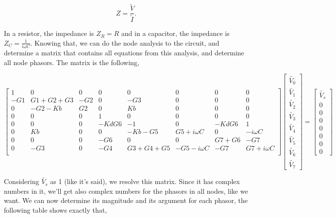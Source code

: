 \begin{equation}
  Z = \frac{\widetilde{V}}{\widetilde{I}}.
  \label{eq:impedance}
\end{equation}

\par In a resistor, the impedance is $Z_R=R$ and in a capacitor, the impedance is $Z_C=\frac{1}{i\omega C}$. Knowing that, we can do the node analysis to the circuit, and determine a matrix that contains all equations from this analysis, and determine all node phasors. The matrix is the following,

$$
\begin{bmatrix}
1 & 0 & 0 & 0 & 0 & 0 & 0 & 0 \\
-G1 & G1+G2+G3 & -G2 & 0 & -G3 & 0 & 0 & 0 \\
0 & -G2-Kb & G2 & 0 & Kb & 0 & 0 & 0 \\
0 & 0 & 0 & 1 & 0 & 0 & 0 & 0 \\
0 & 0 & 0 & -KdG6 & -1 & 0 & -KdG6 & 1 \\
0 & Kb & 0 & 0 & -Kb-G5 & G5+i\omega C & 0 & -i\omega C \\
0 & 0 & 0 & -G6 & 0 & 0 & G7+G6 & -G7 \\
0 & -G3 & 0 & -G4 & G3+G4+G5 & -G5-i\omega C & -G7 & G7+i\omega C \\
\end{bmatrix}
\begin{bmatrix}
\widetilde{V_0} \\
\widetilde{V_1} \\
\widetilde{V_2} \\
\widetilde{V_3} \\
\widetilde{V_4} \\
\widetilde{V_5} \\
\widetilde{V_6} \\
\widetilde{V_7}  
\end{bmatrix}
=
\begin{bmatrix}
\widetilde{V_s} \\
0 \\
0 \\
0 \\
0 \\
0 \\
0 \\
0  
\end{bmatrix}
$$

\par Considering $\widetilde{V_s}$ as 1 (like it's said), we resolve this matrix. Since it has complex numbers in it, we'll get also complex numbers for the phasors in all nodes, like we want. We can now determine its magnitude and its argument for each phasor, the following table shows exactly that,

